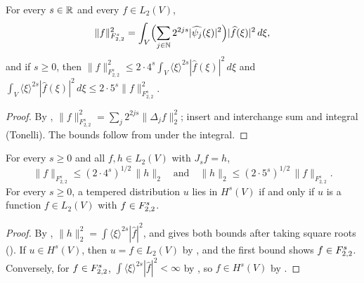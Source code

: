 \begin{lemma}
\label{lem:tl-two-fourier}
\leanok
{}
For every $s \in \mathbb{R}$ and every $f \in L_2(V)$,
\[
  \|f\|_{F^s_{2,2}}^2 = \int_V \Bigl( \sum_{j \in \mathbb{N}} 2^{2js} |\widehat{\psi_j}(\xi)|^2 \Bigr)
  |\widehat f(\xi)|^2 \, d\xi ,
\]
and if $s \geq 0$, then
$\|f\|_{F^s_{2,2}}^2 \leq 2 \cdot 4^s \int_V \langle \xi \rangle^{2s} |\widehat f(\xi)|^2 \, d\xi$
and $\int_V \langle \xi \rangle^{2s} |\widehat f(\xi)|^2 \, d\xi \leq 2 \cdot 5^s
\|f\|_{F^s_{2,2}}^2$.
\end{lemma}

\begin{proof}
\leanok
By , $\|f\|_{F^s_{2,2}}^2 = \sum_j 2^{2js} \|\Delta_j f\|_2^2$; insert
 and interchange sum and integral (Tonelli). The bounds follow
from  under the integral.
\end{proof}

\begin{theorem}[$H^s = \TL{s}{2}{2}$]
\label{thm:sobolev-two-triebel-lizorkin}
\leanok
{}
For every $s \geq 0$ and all $f, h \in L_2(V)$ with $J_s f = h$,
\[
  \|f\|_{F^s_{2,2}} \leq (2 \cdot 4^s)^{1/2} \, \|h\|_2
  \quad \text{and} \quad
  \|h\|_2 \leq (2 \cdot 5^s)^{1/2} \, \|f\|_{F^s_{2,2}} .
\]
For every $s \geq 0$, a tempered distribution $u$ lies in $H^s(V)$ if and only if $u$ is a
function $f \in L_2(V)$ with $f \in F^{s}_{2,2}$.
\end{theorem}

\begin{proof}
\leanok
By , $\|h\|_2^2 = \int \langle \xi \rangle^{2s} |\widehat f|^2$,
and  gives both bounds after taking square roots
(). If $u \in H^s(V)$, then $u = f \in L_2(V)$ by
, and the first bound shows $f \in F^{s}_{2,2}$. Conversely, for
$f \in F^{s}_{2,2}$, $\int \langle \xi \rangle^{2s} |\widehat f|^2 < \infty$ by
, so $f \in H^s(V)$ by .
\end{proof}

